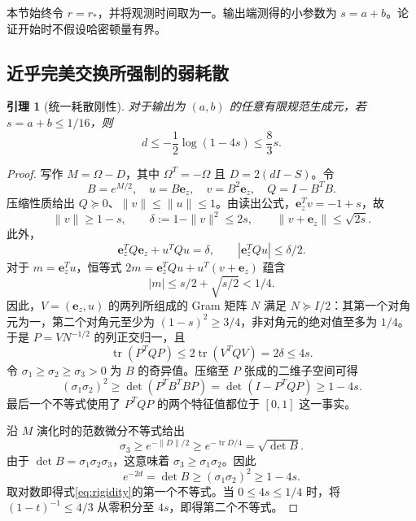 \documentclass[UTF8,11pt,a4paper,fontset=fandol]{ctexart}
\newtheorem{lemma}[theorem]{引理}
\theoremstyle{definition}
\theoremstyle{remark}
\DeclareMathOperator{\tr}{tr}
\newcommand{\ee}{\mathbf e_z}
\newcommand{\PSD}{\succeq0}
\begin{document}
本节始终令 \(r=r_*\)，并将观测时间取为一。输出端测得的小参数为 \(s=a+b\)。论证开始时不假设哈密顿量有界。

\subsection{近乎完美交换所强制的弱耗散}
\begin{lemma}[统一耗散刚性]\label{lem:rigidity}
对于输出为 \((a,b)\) 的任意有限规范生成元，若 \(s=a+b\leq1/16\)，则
\begin{equation}\label{eq:rigidity}
 d\leq-\frac12\log(1-4s)\leq\frac83s.
\end{equation}
\end{lemma}
\begin{proof}
写作 \(M=\Omega-D\)，其中 \(\Omega^T=-\Omega\) 且 \(D=2(dI-S)\)。令
\[
 B=e^{M/2},\quad u=B\ee,\quad v=B^2\ee,\quad Q=I-B^TB.
\]
压缩性质给出 \(Q\PSD\)、\(\|v\|\leq\|u\|\leq1\)。由读出公式，\(\ee^Tv=-1+s\)，故
\[
 \|v\|\geq1-s,\qquad \delta:=1-\|v\|^2\leq2s,
 \qquad\|v+\ee\|\leq\sqrt{2s}.
\]
此外，
\[
 \ee^TQ\ee+u^TQu=\delta,
 \qquad |\ee^TQu|\leq\delta/2.
\]
对于 \(m=\ee^Tu\)，恒等式
\(2m=\ee^TQu+u^T(v+\ee)\) 蕴含
\[
 |m|\leq s/2+\sqrt{s/2}<1/4.
\]
因此，\(V=(\ee,u)\) 的两列所组成的 Gram 矩阵 \(N\) 满足 \(N\succeq I/2\)：其第一个对角元为一，第二个对角元至少为 \((1-s)^2\geq3/4\)，非对角元的绝对值至多为 \(1/4\)。于是 \(P=VN^{-1/2}\) 的列正交归一，且
\[
 \tr(P^TQP)\leq2\tr(V^TQV)=2\delta\leq4s.
\]
令 \(\sigma_1\geq\sigma_2\geq\sigma_3>0\) 为 \(B\) 的奇异值。压缩至 \(P\) 张成的二维子空间可得
\begin{equation}\label{eq:singular-area}
 (\sigma_1\sigma_2)^2\geq\det(P^TB^TBP)
 =\det(I-P^TQP)\geq1-4s.
\end{equation}
最后一个不等式使用了 \(P^TQP\) 的两个特征值都位于 \([0,1]\) 这一事实。

沿 \(M\) 演化时的范数微分不等式给出
\[
 \sigma_3\geq e^{-\|D\|/2}\geq e^{-\tr D/4}
 =\sqrt{\det B}.
\]
由于 \(\det B=\sigma_1\sigma_2\sigma_3\)，这意味着 \(\sigma_3\geq\sigma_1\sigma_2\)。因此
\[
 e^{-2d}=\det B\geq(\sigma_1\sigma_2)^2\geq1-4s.
\]
取对数即得式\eqref{eq:rigidity}的第一个不等式。当 \(0\leq4s\leq1/4\) 时，将 \((1-t)^{-1}\leq4/3\) 从零积分至 \(4s\)，即得第二个不等式。
\end{proof}
\end{document}
